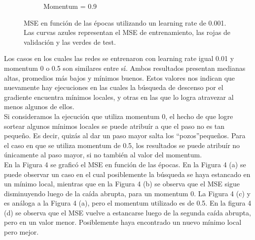 \documentclass[12pt, a4paper]{article}
\begin{document}
\begin{figure}
\begin{subfigure}[b]{0.45\textwidth}
        \caption{Momentum = 0.9}
    \end{subfigure}
    \caption{MSE en función de las épocas utilizando un learning rate de 0.001. Las curvas azules representan el MSE de entrenamiento, las rojas de validación y las verdes de test.}
\end{figure}

\bigskip

Los casos en los cuales las redes se entrenaron con learning rate igual 0.01 y momentum 0 o 0.5 son similares entre sí. Ambos resultados presentan medianas altas, promedios más bajos y mínimos buenos. Estos valores nos indican que nuevamente hay ejecuciones en las cuales la búsqueda de descenso por el gradiente encuentra mínimos locales, y otras en las que lo logra atravezar al menos algunos de ellos. \\
Si consideramos la ejecución que utiliza momentum 0, el hecho de que logre sortear algunos mínimos locales se puede atribuír a que el paso no es tan pequeño. Es decir, quizás al dar un paso mayor salta los \textquotedblleft pozos\textquotedblright pequeños. Para el caso en que se utiliza momentum de 0.5, los resultados se puede atribuír no únicamente al paso mayor, si no también al valor del momentum.\\
En la Figura 4 se graficó el MSE en función de las épocas. En la Figura 4 (a) se puede observar un caso en el cual posiblemente la búsqueda se haya estancado en un mínimo local, mientras que en la Figura 4 (b) se observa que el MSE sigue disminuyendo luego de la caída abrupta, para un momentum 0. La Figura 4 (c) y es análoga a la Figura 4 (a), pero el momentum utilizado es de 0.5. En la figura 4 (d) se observa que el MSE vuelve a estancarse luego de la segunda caída abrupta, pero en un valor menor. Posiblemente haya encontrado un nuevo mínimo local pero mejor.
\end{document}
